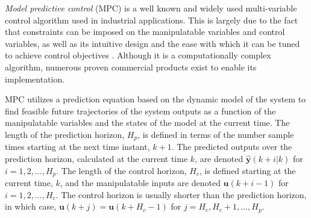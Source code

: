 \textit{Model predictive control} (MPC) is a well known and widely used multi-variable control algorithm used in industrial applications. This is largely due to the fact that constraints can be imposed on the manipulatable variables and control variables, as well as its intuitive design and the ease with which it can be tuned to achieve control objectives \citep{maciejowski_predictive_2002}. Although it is a computationally complex algorithm, numerous proven commercial products exist to enable its implementation.

MPC utilizes a prediction equation based on the dynamic model of the system to find feasible future trajectories of the system outputs as a function of the manipulatable variables and the states of the model at the current time. The length of the prediction horizon, $H_p$, is defined in terms of the number sample times starting at the next time instant, $k+1$. The predicted outputs over the prediction horizon, calculated at the current time $k$, are denoted $\hat{\textbf{y}}(k+i | k)$ for $i=1,2,...,H_p$. The length of the control horizon, $H_c$, is defined starting at the current time, $k$, and the manipulatable inputs are denoted $\mathbf{u}(k+i-1)$ for $i=1,2,...,H_c$. The control horizon is usually shorter than the prediction horizon, in which case, $\mathbf{u}(k+j)=\mathbf{u}(k+H_c-1)$ for $j=H_c,H_c+1,...,H_p$.

